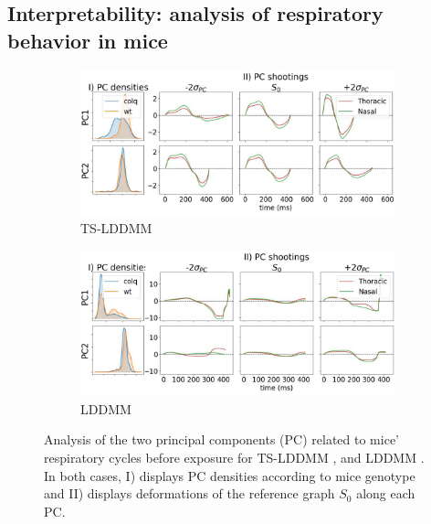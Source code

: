 \subsection{Interpretability: analysis of respiratory behavior in mice}
\begin{figure}[t]
  \centering
  \begin{subfigure}[b]{0.49\textwidth}
    \centering
    \includegraphics[width = \textwidth]{pictures/ts_ddmm_shooting.pdf}
    \caption{TS-LDDMM}
    \label{fig:ts-lddmm shooting}
  \end{subfigure}
  \begin{subfigure}[b]{0.49\textwidth}
    \centering
    \includegraphics[width = \textwidth]{pictures/lddmm_shooting.pdf}
    \caption{LDDMM}
    \label{fig:lddmm shooting}
  \end{subfigure}
  \caption{Analysis of the two principal components (PC) related to mice' respiratory cycles before exposure for TS-LDDMM , and LDDMM .
  In both cases, I) displays PC densities according to mice genotype and II) displays  deformations of the reference graph $S_0$ along each PC.}
  \label{fig:exp1}
\end{figure}

